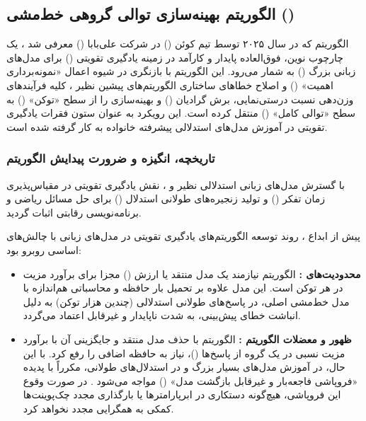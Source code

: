 \subsection{الگوریتم بهینه‌سازی توالی گروهی خط‌مشی ()}

الگوریتم  که در سال ۲۰۲۵ توسط تیم کوئن () در شرکت علی‌بابا () معرفی شد \cite{zheng2025gspo}، یک چارچوب نوین، فوق‌العاده پایدار و کارآمد در زمینه یادگیری تقویتی () برای مدل‌های زبانی بزرگ () به شمار می‌رود. این الگوریتم با بازنگری در شیوه اعمال «نمونه‌برداری اهمیت» () و اصلاح خطاهای ساختاری الگوریتم‌های پیشین نظیر  \cite{shao2024deepseekmath}، کلیه فرآیندهای وزن‌دهی نسبت درستی‌نمایی، برش گرادیان () و بهینه‌سازی را از سطح «توکن» () به سطح «توالی کامل» () منتقل کرده است. این رویکرد به عنوان ستون فقرات یادگیری تقویتی در آموزش مدل‌های استدلالی پیشرفته خانواده  \cite{qwen2025technical, qwen2025qwq} به کار گرفته شده است.

\subsubsection*{تاریخچه، انگیزه و ضرورت پیدایش الگوریتم}

با گسترش مدل‌های زبانی استدلالی نظیر  \cite{openai2024learning} و  \cite{deepseek2025r1}، نقش یادگیری تقویتی در مقیاس‌پذیری زمان تفکر () و تولید زنجیره‌های طولانی استدلال () برای حل مسائل ریاضی و برنامه‌نویسی رقابتی اثبات گردید.

پیش از ابداع ، روند توسعه الگوریتم‌های یادگیری تقویتی در مدل‌های زبانی با چالش‌های اساسی روبرو بود:
\begin{itemize}
    \item \textbf{محدودیت‌های  \cite{schulman2017proximal}:} الگوریتم  نیازمند یک مدل منتقد یا ارزش () مجزا برای برآورد مزیت در هر توکن است. این مدل علاوه بر تحمیل بار حافظه و محاسباتی هم‌اندازه با مدل خط‌مشی اصلی، در پاسخ‌های طولانی استدلالی (چندین هزار توکن) به دلیل انباشت خطای پیش‌بینی، به شدت ناپایدار و غیرقابل اعتماد می‌گردد.
    \item \textbf{ظهور و معضلات الگوریتم  \cite{shao2024deepseekmath}:} الگوریتم  با حذف مدل منتقد و جایگزینی آن با برآورد مزیت نسبی در یک گروه از پاسخ‌ها ()، نیاز به حافظه اضافی را رفع کرد. با این حال،  در آموزش مدل‌های بسیار بزرگ و در استدلال‌های طولانی، مکرراً با پدیده «فروپاشی فاجعه‌بار و غیرقابل بازگشت مدل» () مواجه می‌شود \cite{qwen2025technical, minimax2025m1}. در صورت وقوع این فروپاشی، هیچ‌گونه دستکاری در ابرپارامترها یا بارگذاری مجدد چک‌پوینت‌ها کمکی به همگرایی مجدد نخواهد کرد.
\end{itemize}

